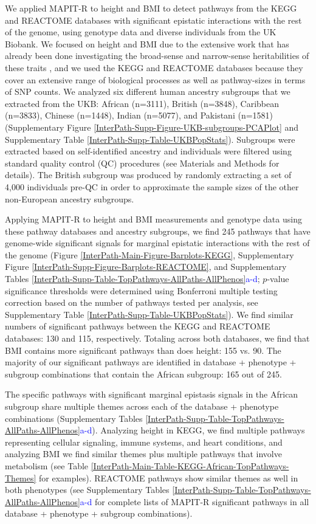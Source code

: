 \documentclass[12pt,a4paper]{article}
\begin{document}
We applied MAPIT-R to height and BMI to detect pathways from the KEGG and REACTOME databases \citep{Liberzon2011} with significant epistatic interactions with the rest of the genome, using genotype data and diverse individuals from the UK Biobank. We focused on height and BMI due to the extensive work that has already been done investigating the broad-sense and narrow-sense heritabilities of these traits \citep{Yang2010,Elks2012,Visscher2012,Finucane2015,Speed2017,Wainschtein2019}, and we used the KEGG and REACTOME databases because they cover an extensive range of biological processes as well as pathway-sizes in terms of SNP counts. We analyzed six different human ancestry subgroups that we extracted from the UKB: African (n=3111), British (n=3848), Caribbean (n=3833), Chinese (n=1448), Indian (n=5077), and Pakistani (n=1581) (Supplementary Figure \ref{InterPath-Supp-Figure-UKB-subgroups-PCAPlot} and Supplementary Table \ref{InterPath-Supp-Table-UKBPopStats}). Subgroups were extracted based on self-identified ancestry and individuals were filtered using standard quality control (QC) procedures (see Materials and Methods for details). The British subgroup was produced by randomly extracting a set of 4,000 individuals pre-QC in order to approximate the sample sizes of the other non-European ancestry subgroups.

Applying MAPIT-R to height and BMI measurements and genotype data using these pathway databases and ancestry subgroups, we find 245 pathways that have genome-wide significant signals for marginal epistatic interactions with the rest of the genome (Figure \ref{InterPath-Main-Figure-Barplots-KEGG}, Supplementary Figure \ref{InterPath-Supp-Figure-Barplots-REACTOME}, and Supplementary Tables \ref{InterPath-Supp-Table-TopPathways-AllPaths-AllPhenos}\textcolor{blue}{a-d}; $p$-value significance thresholds were determined using Bonferroni multiple testing correction based on the number of pathways tested per analysis, see Supplementary Table \ref{InterPath-Supp-Table-UKBPopStats}). We find similar numbers of significant pathways between the KEGG and REACTOME databases: 130 and 115, respectively. Totaling across both databases, we find that BMI contains more significant pathways than does height: 155 vs. 90. The majority of our significant pathways are identified in database + phenotype + subgroup combinations that contain the African subgroup: 165 out of 245.

The specific pathways with significant marginal epistasis signals in the African subgroup share multiple themes across each of the database + phenotype combinations (Supplementary Tables \ref{InterPath-Supp-Table-TopPathways-AllPaths-AllPhenos}\textcolor{blue}{a-d}). Analyzing height in KEGG, we find multiple pathways representing cellular signaling, immune systems, and heart conditions, and analyzing BMI we find similar themes plus multiple pathways that involve metabolism (see Table \ref{InterPath-Main-Table-KEGG-African-TopPathways-Themes} for examples). REACTOME pathways show similar themes as well in both phenotypes (see Supplementary Tables \ref{InterPath-Supp-Table-TopPathways-AllPaths-AllPhenos}\textcolor{blue}{a-d} for complete lists of MAPIT-R significant pathways in all database + phenotype + subgroup combinations).  
\end{document}
